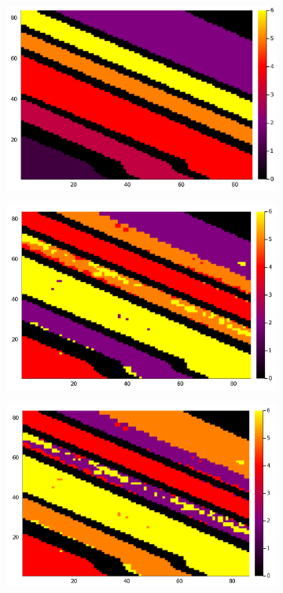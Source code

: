 \documentclass[a4paper, 10pt]{article}
\begin{document}
\begin{figure}[ht]
      \centering
      \begin{subfigure}[b]{0.24\textwidth}
            \centering
            \includegraphics[width=\linewidth]{salinasgt.png}
            \label{fig:salinasgt}
      \end{subfigure}
      \begin{subfigure}[b]{0.24\textwidth}
            \centering
            \includegraphics[width=\linewidth]{risodata.png}
            \label{fig:salinasr}
      \end{subfigure}
      \centering
      \begin{subfigure}[b]{0.24\textwidth}
            \centering
            \includegraphics[width=\linewidth]{kisodata.png}

\end{subfigure}
\end{figure}
\end{document}
